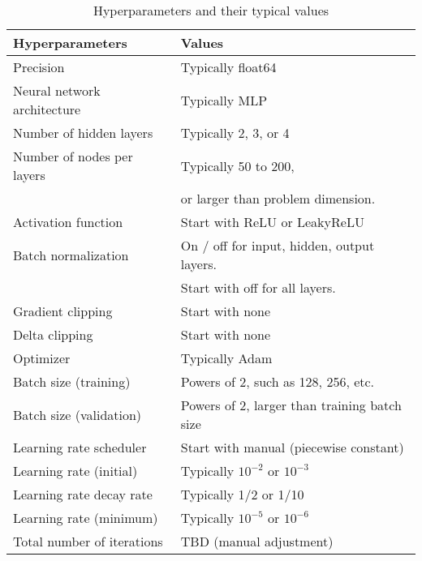 \documentclass{tufte-handout}
\begin{document}
\begin{table}[ht]
    \centering
    \small
    \begin{tabular}{l|l}
        \hline
        \textbf{Hyperparameters} & \textbf{Values} \\ \hline
        Precision & Typically float64 \\ \hline

        Neural network architecture & Typically MLP \\ 
        Number of hidden layers & Typically 2, 3, or 4 \\ 
        Number of nodes per layers & Typically 50 to 200, \\ 
        & or larger than problem dimension. \\ 
        Activation function & Start with ReLU or LeakyReLU \\ \hline

        Batch normalization & On / off for input, hidden, output layers. \\ 
        & Start with off for all layers. \\ 
        Gradient clipping & Start with none \\ 
        Delta clipping & Start with none \\ \hline
        Optimizer & Typically Adam \\ 
        Batch size (training) & Powers of 2, such as 128, 256, etc. \\ 
        Batch size (validation) & Powers of 2, larger than training batch size \\ \hline
        Learning rate scheduler & Start with manual (piecewise constant) \\ 
        Learning rate (initial) & Typically $10^{-2}$ or $10^{-3}$ \\ 
        Learning rate decay rate & Typically 1/2 or 1/10 \\ 
        Learning rate (minimum) & Typically $10^{-5}$ or $10^{-6}$ \\ 
        Total number of iterations & TBD (manual adjustment) \\ \hline
    \end{tabular}
    \caption{Hyperparameters and their typical values}
    \label{tab:hyperparameters}
\end{table}
\end{document}
